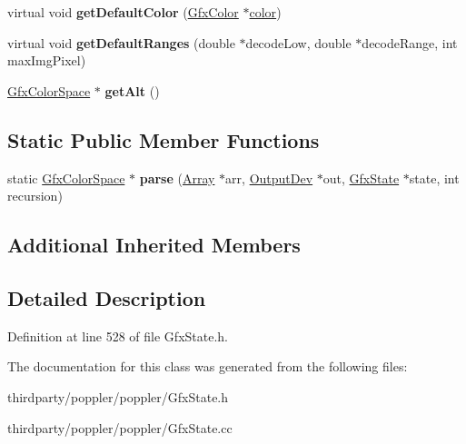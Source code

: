 \begin{DoxyCompactItemize}
\mbox{\label{class_gfx_i_c_c_based_color_space_a1939e715e71bc4f5f881c2b07ac84180}} 
virtual void {\bfseries get\+Default\+Color} (\hyperlink{struct_gfx_color}{Gfx\+Color} $\ast$\hyperlink{structcolor}{color})
\item 
\mbox{\label{class_gfx_i_c_c_based_color_space_a99583042467644238e8908c0a5f47b4c}} 
virtual void {\bfseries get\+Default\+Ranges} (double $\ast$decode\+Low, double $\ast$decode\+Range, int max\+Img\+Pixel)
\item 
\mbox{\label{class_gfx_i_c_c_based_color_space_ac6e33aed82fc7f9b23ecc95a3d63ab82}} 
\hyperlink{class_gfx_color_space}{Gfx\+Color\+Space} $\ast$ {\bfseries get\+Alt} ()
\end{DoxyCompactItemize}
\subsection*{Static Public Member Functions}
\begin{DoxyCompactItemize}
\item 
\mbox{\label{class_gfx_i_c_c_based_color_space_a1b1619642034ed9b87e0b1d228c67a69}} 
static \hyperlink{class_gfx_color_space}{Gfx\+Color\+Space} $\ast$ {\bfseries parse} (\hyperlink{class_array}{Array} $\ast$arr, \hyperlink{class_output_dev}{Output\+Dev} $\ast$out, \hyperlink{class_gfx_state}{Gfx\+State} $\ast$state, int recursion)
\end{DoxyCompactItemize}
\subsection*{Additional Inherited Members}


\subsection{Detailed Description}


Definition at line 528 of file Gfx\+State.\+h.



The documentation for this class was generated from the following files\+:\begin{DoxyCompactItemize}
\item 
thirdparty/poppler/poppler/Gfx\+State.\+h\item 
thirdparty/poppler/poppler/Gfx\+State.\+cc\end{DoxyCompactItemize}
